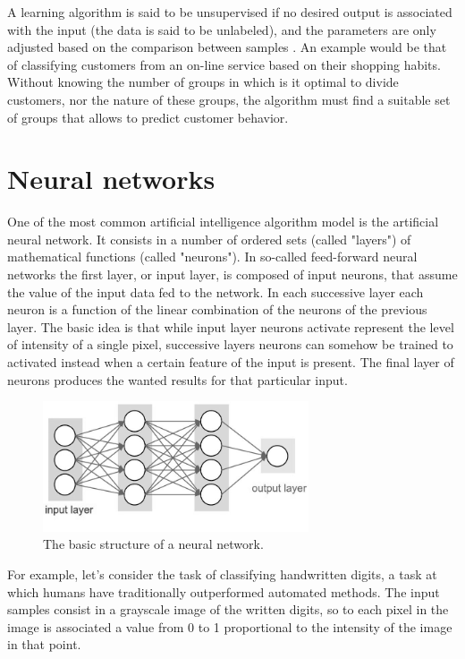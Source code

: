 \documentclass[a4paper]{report}
\begin{document}
A learning algorithm is said to be unsupervised if no desired output is associated with the input (the data is said to be unlabeled), and the parameters are only adjusted based on the comparison between samples \cite{bishop2006pattern}.
An example would be that of classifying customers from an on-line service based on their shopping habits.
Without knowing the number of groups in which is it optimal to divide customers, nor the nature of these groups, the algorithm must find a suitable set of groups that allows to predict customer behavior.

\section{Neural networks}
One of the most common artificial intelligence algorithm model is the artificial neural network.
It consists in a number of ordered sets (called "layers") of mathematical functions (called "neurons").
In so-called feed-forward neural networks the first layer, or input layer, is composed of input neurons, that assume the value of the input data fed to the network.
In each successive layer each neuron is a function of the linear combination of the neurons of the previous layer.
The basic idea is that while input layer neurons activate represent the level of intensity of a single pixel, successive layers neurons can somehow be trained to activated instead when a certain feature of the input is present.
The final layer of neurons produces the wanted results for that particular input.
\begin{figure} [H]
\centering
\includegraphics [width=0.7\textwidth] {o/neuralnetwork.png}
\caption{The basic structure of a neural network.}
\end{figure}
For example, let's consider the task of classifying handwritten digits, a task at which humans have traditionally outperformed automated methods.
The input  samples consist in a grayscale image of the written digits, so to each pixel in the image is associated a value from 0 to 1 proportional to the intensity of the image in that point.
\end{document}
